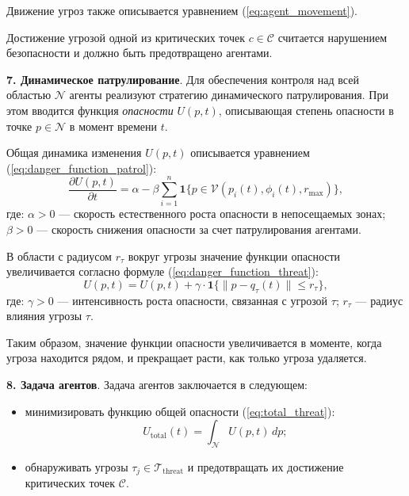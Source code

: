 Движение угроз также описывается уравнением (\ref{eq:agent_movement}).

Достижение угрозой одной из критических точек $c \in \mathcal{C}$ считается нарушением безопасности и должно быть предотвращено агентами.

\textbf{7. Динамическое патрулирование}.  
Для обеспечения контроля над всей областью $\mathcal{N}$ агенты реализуют стратегию динамического патрулирования.
При этом вводится функция \textit{опасности} $U(p, t)$, описывающая степень опасности в точке $p \in \mathcal{N}$ в момент времени $t$. 

Общая динамика изменения $U(p, t)$ описывается уравнением (\ref{eq:danger_function_patrol}):
\begin{equation}
	\frac{\partial U(p, t)}{\partial t} = \alpha - \beta \sum_{i=1}^n \mathbf{1}\{p \in \mathcal{V}(p_i(t), \phi_i(t), r_{\text{max}})\},
	\label{eq:danger_function_patrol}
\end{equation}
где:
$\alpha > 0$ — скорость естественного роста опасности в непосещаемых зонах;
$\beta > 0$ — скорость снижения опасности за счет патрулирования агентами.

В области с радиусом $r_\tau$ вокруг угрозы значение функции опасности увеличивается согласно формуле (\ref{eq:danger_function_threat}):
\begin{equation}
	U(p, t) = U(p, t) + \gamma \cdot \mathbf{1}\{\|p - q_\tau(t)\| \leq r_\tau\},
	\label{eq:danger_function_threat}
\end{equation}
где:
$\gamma > 0$ — интенсивность роста опасности, связанная с угрозой $\tau$;
$r_\tau$ — радиус влияния угрозы $\tau$.

Таким образом, значение функции опасности увеличивается в моменте, когда угроза находится рядом, и прекращает расти, как только угроза удаляется.

\textbf{8. Задача агентов}.  
Задача агентов заключается в следующем:  
\begin{itemize}
	\item минимизировать функцию общей опасности (\ref{eq:total_threat}):
	\begin{equation}
	U_{\text{total}}(t) = \int_{\mathcal{N}} U(p, t) \, dp;
	\label{eq:total_threat}
	\end{equation}
	\item обнаруживать угрозы $\tau_j \in \mathcal{T}_{\text{threat}}$ и предотвращать их достижение критических точек $\mathcal{C}$.
\end{itemize}

